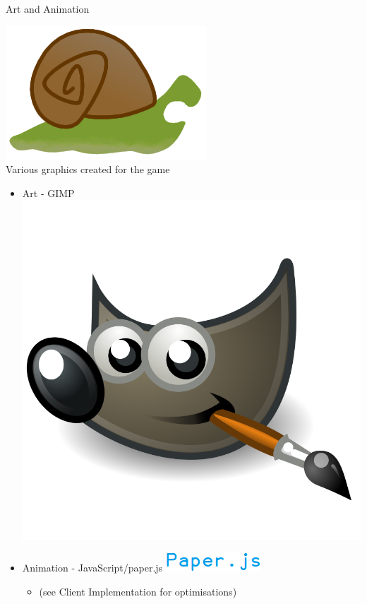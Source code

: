 \documentclass{beamer}
\begin{document}
\begin{frame}{Art and Animation}
\begin{center}
    \includegraphics[scale=0.15]{snail_teeth.png} \\
    Various graphics created for the game
  \end{center}
  \begin{itemize}
    \item Art - GIMP
      \hfill
      \includegraphics[scale=0.025]{gimp_logo.png}
    \item Animation - JavaScript/paper.js
      \hfill
      \includegraphics[scale=0.4]{paper_logo.png}
      \begin{itemize}
        \item (see Client Implementation for optimisations)
      \end{itemize}
  \end{itemize}
\end{frame}
\end{document}
